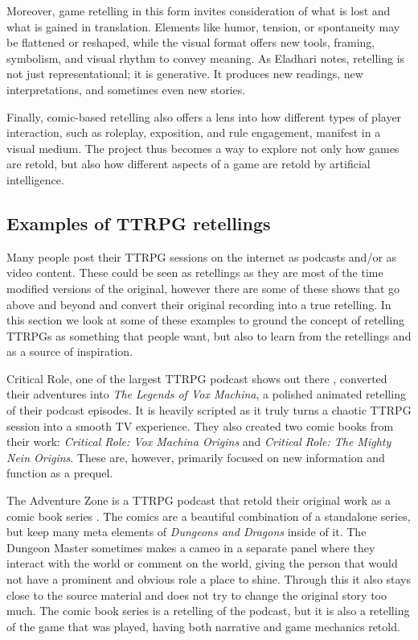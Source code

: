 Moreover, game retelling in this form invites consideration of what is lost and what is gained in translation. Elements like humor, tension, or spontaneity may be flattened or reshaped, while the visual format offers new tools, framing, symbolism, and visual rhythm to convey meaning. As Eladhari notes, retelling is not just representational; it is generative. It produces new readings, new interpretations, and sometimes even new stories.

Finally, comic-based retelling also offers a lens into how different types of player interaction, such as roleplay, exposition, and rule engagement, manifest in a visual medium. The project thus becomes a way to explore not only how games are retold, but also how different aspects of a game are retold by artificial intelligence.

\subsection{Examples of TTRPG retellings}
Many people post their TTRPG sessions on the internet as podcasts and/or as video content. These could be seen as retellings as they are most of the time modified versions of the original, however there are some of these shows that go above and beyond and convert their original recording into a true retelling. In this section we look at some of these examples to ground the concept of retelling TTRPGs as something that people want, but also to learn from the retellings and as a source of inspiration.

Critical Role, one of the largest TTRPG podcast shows out there \cite{criticalrole_liveplay}, converted their adventures into \textit{The Legends of Vox Machina}\cite{criticalrole_legends_vox_machina}, a polished animated retelling of their podcast episodes. It is heavily scripted as it truly turns a chaotic TTRPG session into a smooth TV experience. They also created two comic books from their work: \textit{Critical Role: Vox Machina Origins}\cite{criticalrole_vox_machina_origins} and \textit{Critical Role: The Mighty Nein Origins}\cite{criticalrole_mighty_nein_origins}. These are, however, primarily focused on new information and function as a prequel.

The Adventure Zone is a TTRPG podcast \cite{adventurezone_podcast} that retold their original work as a comic book series \cite{AdventureZone2018}. The comics are a beautiful combination of a standalone series, but keep many meta elements of \textit{Dungeons and Dragons} inside of it. The Dungeon Master sometimes makes a cameo in a separate panel where they interact with the world or comment on the world, giving the person that would not have a prominent and obvious role a place to shine. Through this it also stays close to the source material and does not try to change the original story too much. The comic book series is a retelling of the podcast, but it is also a retelling of the game that was played, having both narrative and game mechanics retold.


